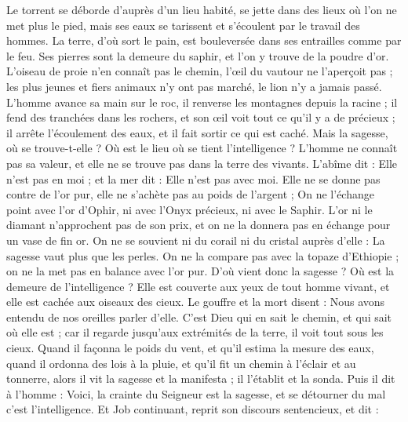 \begin{multicols}{2}
Le torrent se déborde d'auprès d'un lieu habité, se jette dans des lieux où l'on ne met plus le pied, mais ses eaux se tarissent et s'écoulent par le travail des hommes.
La terre, d'où sort le pain, est bouleversée dans ses entrailles comme par le feu.
Ses pierres sont la demeure du saphir, et l'on y trouve de la poudre d'or.
L'oiseau de proie n'en connaît pas le chemin, l'œil du vautour ne l'aperçoit pas ;
les plus jeunes et fiers animaux n'y ont pas marché, le lion n'y a jamais passé.
L'homme avance sa main sur le roc, il renverse les montagnes depuis la racine ;
il fend des tranchées dans les rochers, et son œil voit tout ce qu'il y a de précieux ;
il arrête l'écoulement des eaux, et il fait sortir ce qui est caché.
Mais la sagesse, où se trouve-t-elle ? Où est le lieu où se tient l'intelligence ?
L'homme ne connaît pas sa valeur, et elle ne se trouve pas dans la terre des vivants.
L'abîme dit : Elle n'est pas en moi ; et la mer dit : Elle n'est pas avec moi.
Elle ne se donne pas contre de l'or pur, elle ne s'achète pas au poids de l'argent ;
On ne l'échange point avec l'or d'Ophir, ni avec l'Onyx précieux, ni avec le Saphir.
L'or ni le diamant n'approchent pas de son prix, et on ne la donnera pas en échange pour un vase de fin or.
On ne se souvient ni du corail ni du cristal auprès d'elle : La sagesse vaut plus que les perles.
On ne la compare pas avec la topaze d'Ethiopie ; on ne la met pas en balance avec l'or pur.
D'où vient donc la sagesse ? Où est la demeure de l'intelligence ?
Elle est couverte aux yeux de tout homme vivant, et elle est cachée aux oiseaux des cieux.
Le gouffre et la mort disent : Nous avons entendu de nos oreilles parler d'elle.
C'est Dieu qui en sait le chemin, et qui sait où elle est ;
car il regarde jusqu'aux extrémités de la terre, il voit tout sous les cieux.
Quand il façonna le poids du vent, et qu'il estima la mesure des eaux,
quand il ordonna des lois à la pluie, et qu'il fit un chemin à l'éclair et au tonnerre,
alors il vit la sagesse et la manifesta ; il l'établit et la sonda.
Puis il dit à l'homme : Voici, la crainte du Seigneur est la sagesse, et se détourner du mal c'est l'intelligence.
\VerseOne{} Et Job continuant, reprit son discours sentencieux, et dit :

\end{multicols}
